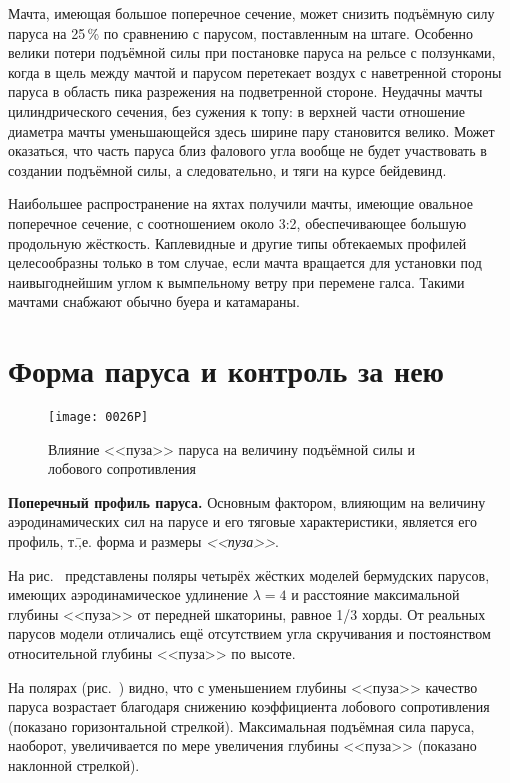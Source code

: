 Мачта, имеющая большое поперечное сечение, может снизить подъёмную
силу паруса на 25\,\% по сравнению с парусом, поставленным на
штаге. Особенно велики потери подъёмной силы при постановке паруса на
рельсе с ползунками, когда в щель между мачтой и парусом перетекает
воздух с наветренной стороны паруса в область пика разрежения на
подветренной стороне. Неудачны мачты цилиндрического сечения, без
сужения к топу: в верхней части отношение диаметра мачты уменьшающейся
здесь ширине пару становится велико. Может оказаться, что часть паруса
близ фалового угла вообще не будет участвовать в создании подъёмной
силы, а следовательно, и тяги на курсе бейдевинд.

Наибольшее распространение на яхтах получили мачты, имеющие овальное
поперечное сечение, с соотношением около 3:2, обеспечивающее большую
продольную жёсткость. Каплевидные и другие типы обтекаемых профилей
целесообразны только в том случае, если мачта вращается для установки
под наивыгоднейшим углом к вымпельному ветру при перемене
галса. Такими мачтами снабжают обычно буера и катамараны.

\section{Форма паруса и контроль за нею}

\begin{figure}[!htb]
  \centering
  \texttt{[image: 0026P]}
  \caption{Влияние <<пуза>> паруса на величину подъёмной силы и лобового сопротивления}
  \label{fig:26}
\end{figure}

\textbf{Поперечный профиль паруса.}
Основным фактором, влияющим на величину аэродинамических сил на парусе
и его тяговые характеристики, является его профиль, т.\=,е. форма и
размеры \textit{<<пуза>>}.

На рис.~ представлены поляры четырёх жёстких моделей
бермудских парусов, имеющих аэродинамическое удлинение $\lambda = 4$ и
расстояние максимальной глубины <<пуза>> от передней шкаторины, равное
1/3 хорды. От реальных парусов модели отличались ещё отсутствием угла
скручивания и постоянством относительной глубины <<пуза>> по высоте.

На полярах (рис.~) видно, что с уменьшением глубины <<пуза>>
качество паруса возрастает благодаря снижению коэффициента лобового
сопротивления (показано горизонтальной стрелкой). Максимальная
подъёмная сила паруса, наоборот, увеличивается по мере увеличения
глубины <<пуза>> (показано наклонной стрелкой).

